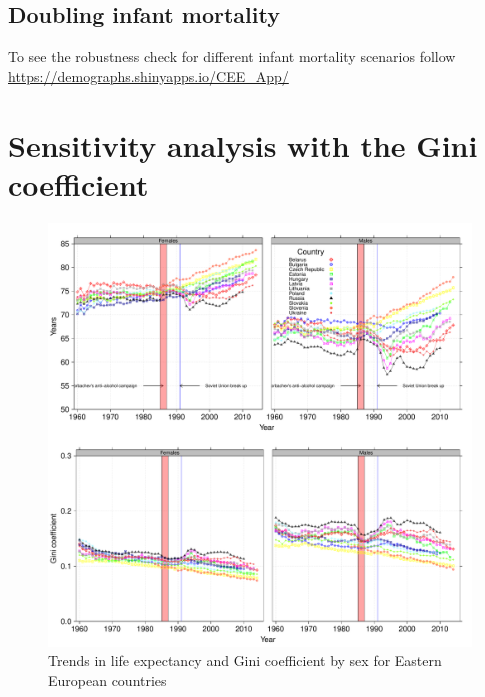 \documentclass{article}
\begin{document}
\subsection*{Doubling infant mortality}
 To see the robustness check for different infant mortality scenarios follow \url{https://demographs.shinyapps.io/CEE_App/}
\newpage
\section*{Sensitivity analysis with the Gini coefficient}

\begin{figure}[h!]
\caption{Trends in life expectancy and Gini coefficient by sex for Eastern European countries}
\centering
\begin{center}
\includegraphics[scale=.4]{Figures/F1_SS}
\end{center}
\end{figure}

\newpage
\end{document}
